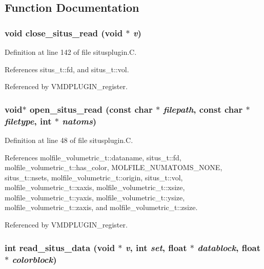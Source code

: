\subsection{Function Documentation}
\subsubsection{\setlength{\rightskip}{0pt plus 5cm}void close\_\-situs\_\-read (void $\ast$ {\em v})\hspace{0.3cm}{\tt  [static]}}\label{situsplugin_8C_a4}




Definition at line 142 of file situsplugin.C.

References situs\_\-t::fd, and situs\_\-t::vol.

Referenced by VMDPLUGIN\_\-register.
\subsubsection{\setlength{\rightskip}{0pt plus 5cm}void$\ast$ open\_\-situs\_\-read (const char $\ast$ {\em filepath}, const char $\ast$ {\em filetype}, int $\ast$ {\em natoms})\hspace{0.3cm}{\tt  [static]}}\label{situsplugin_8C_a1}




Definition at line 48 of file situsplugin.C.

References molfile\_\-volumetric\_\-t::dataname, situs\_\-t::fd, molfile\_\-volumetric\_\-t::has\_\-color, MOLFILE\_\-NUMATOMS\_\-NONE, situs\_\-t::nsets, molfile\_\-volumetric\_\-t::origin, situs\_\-t::vol, molfile\_\-volumetric\_\-t::xaxis, molfile\_\-volumetric\_\-t::xsize, molfile\_\-volumetric\_\-t::yaxis, molfile\_\-volumetric\_\-t::ysize, molfile\_\-volumetric\_\-t::zaxis, and molfile\_\-volumetric\_\-t::zsize.

Referenced by VMDPLUGIN\_\-register.
\subsubsection{\setlength{\rightskip}{0pt plus 5cm}int read\_\-situs\_\-data (void $\ast$ {\em v}, int {\em set}, float $\ast$ {\em datablock}, float $\ast$ {\em colorblock})\hspace{0.3cm}{\tt  [static]}}\label{situsplugin_8C_a3}




